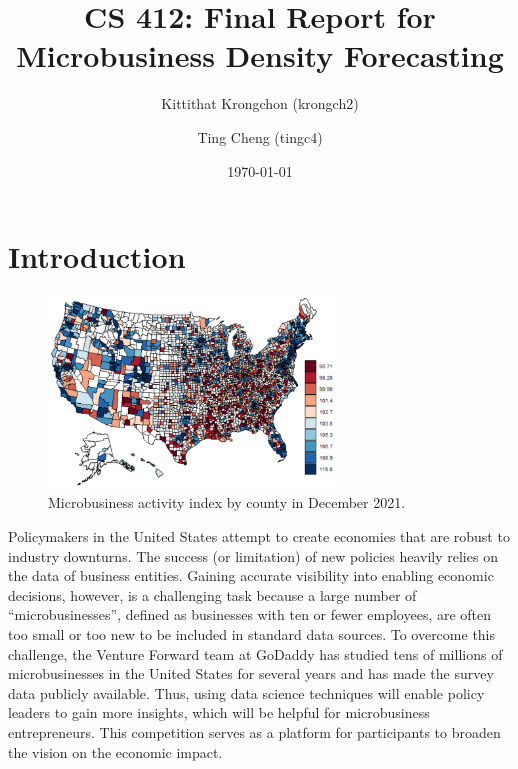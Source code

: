 \documentclass[prl,aps,superscriptaddress,twocolumn,10pt,nolongbibliography]{revtex4-2}
\begin{document}
\title{CS 412: Final Report for Microbusiness Density Forecasting}
\author{Kittithat Krongchon (krongch2)}
\author{Ting Cheng (tingc4)}
\date{\today}

\maketitle

\section{Introduction}
\begin{figure}
\includegraphics[width=3in]{figs/activity.png}
\caption{\label{fig:activity}
Microbusiness activity index by county in December 2021.
}
\end{figure}

Policymakers in the United States attempt to create economies that are robust to industry downturns. 
The success (or limitation) of new policies heavily relies on the data of business entities. 
Gaining accurate visibility into enabling economic decisions, however, is a challenging task because a large number of ``microbusinesses'', defined as businesses with ten or fewer employees, are often too small or too new to be included in standard data sources.
To overcome this challenge, the Venture Forward team at GoDaddy has studied tens of millions of microbusinesses in the United States for several years and has made the survey data publicly available. 
Thus, using data science techniques will enable policy leaders to gain more insights, which will be helpful for microbusiness entrepreneurs. 
This competition serves as a platform for participants to broaden the vision on the economic impact. 
\end{document}
